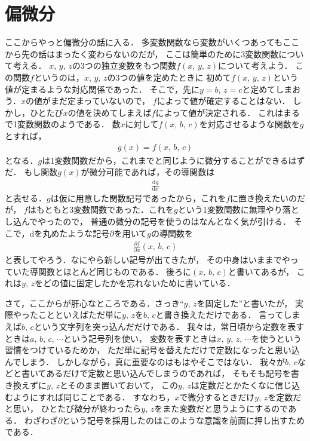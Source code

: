 \section{偏微分}
ここからやっと偏微分の話に入る．
多変数関数なら変数がいくつあってもここから先の話はまったく変わらないのだが，
ここは簡単のために3変数関数について考える．
$x, \, y, \, z$の3つの独立変数をもつ関数$f(x, \, y, \, z)$について考えよう．
この関数$f$というのは，$x, \, y, \, z$の3つの値を定めたときに
初めて$f(x, \, y, \, z)$という値が定まるような対応関係であった．
そこで，先に$y=b, \, z=c$と定めてしまおう．$x$の値がまだ定まっていないので，
$f$によって値が確定することはない．
しかし，ひとたび$x$の値を決めてしまえば$f$によって値が決定される．
これはまるで1変数関数のようである．
数$x$に対して$f(x, \, b, \, c)$を対応させるような関数を$g$とすれば，
\begin{align*}
g(x) = f(x, \, b, \, c)
\end{align*}
となる．$g$は1変数関数だから，これまでと同じように微分することができるはずだ．
もし関数$g(x)$が微分可能であれば，その導関数は
\begin{align*}
\frac{\mathrm{d}g}{\mathrm{d}x}
\end{align*}
と表せる．$g$は仮に用意した関数記号であったから，これを$f$に置き換えたいのだが，
$f$はもともと3変数関数であった．これを$g$という1変数関数に無理やり落とし込んでやったので，
普通の微分の記号を使うのはなんとなく気が引ける．
そこで，dを丸めたような記号$\partial$を用いて$g$の導関数を
\begin{align*}
\frac{\partial f}{\partial x} (x, \, b, \, c)
\end{align*}
と表してやろう．なにやら新しい記号が出てきたが，
その中身はいままでやっていた導関数とほとんど同じものである．
後ろに$(x, \, b, \, c)$と書いてあるが，
これは$y, \, z$をどの値に固定したかを忘れないために書いている．

さて，ここからが肝心なところである．さっき``$y, \, z$を固定した''と書いたが，
実際やったことといえばただ単に$y, \, z$を$b, \, c$と書き換えただけである．
言ってしまえば$b, \, c$という文字列を突っ込んだだけである．
我々は，常日頃から定数を表すときは$a, \, b, \,  c, \, \cdots$という記号列を使い，
変数を表すときは$x, \, y, \, z , \, \cdots$を使うという習慣をつけているためか，
ただ単に記号を替えただけで定数になったと思い込んでしまう．
しかしながら，真に重要なのはもはやそこではない．
我々が$b, \, c$などと書いてあるだけで定数と思い込んでしまうのであれば，
そもそも記号を書き換えずに$y, \, z$とそのまま置いておいて，
この$y, \, z$は定数だとかたくなに信じ込むようにすれば同じことである．
すなわち，$x$で微分するときだけ$y, \, z$を定数だと思い，
ひとたび微分が終わったら$y, \, z$をまた変数だと思うようにするのである．
わざわざ$\partial$という記号を採用したのはこのような意識を前面に押し出すためである．

